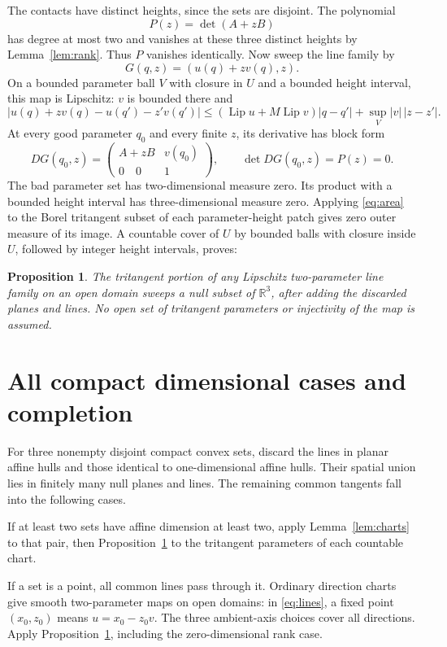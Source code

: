 \documentclass[11pt]{article}
\newcommand{\R}{\mathbb R}
\newtheorem{proposition}[theorem]{Proposition}
\theoremstyle{remark}
\begin{document}
The contacts have distinct heights, since the sets are disjoint. The polynomial
\[
P(z)=\det(A+zB)
\]
has degree at most two and vanishes at these three distinct heights by Lemma~\ref{lem:rank}. Thus $P$ vanishes identically. Now sweep the line family by
\[
G(q,z)=(u(q)+zv(q),z).
\]
On a bounded parameter ball $V$ with closure in $U$ and a bounded height interval, this map is Lipschitz: $v$ is bounded there and
\[
|u(q)+zv(q)-u(q')-z'v(q')|
\le (\operatorname{Lip}u+M\operatorname{Lip}v)|q-q'|+\sup_V|v|\,|z-z'|.
\]
At every good parameter $q_0$ and every finite $z$, its derivative has block form
\[
DG(q_0,z)=\begin{pmatrix}A+zB&v(q_0)\\0\quad0&1\end{pmatrix},
\qquad\det DG(q_0,z)=P(z)=0.
\]
The bad parameter set has two-dimensional measure zero. Its product with a bounded height interval has three-dimensional measure zero. Applying \eqref{eq:area} to the Borel tritangent subset of each parameter-height patch gives zero outer measure of its image. A countable cover of $U$ by bounded balls with closure inside $U$, followed by integer height intervals, proves:
\begin{proposition}\label{prop:sweep}
The tritangent portion of any Lipschitz two-parameter line family on an open domain sweeps a null subset of $\R^3$, after adding the discarded planes and lines. No open set of tritangent parameters or injectivity of the map is assumed.
\end{proposition}

\section{All compact dimensional cases and completion}
For three nonempty disjoint compact convex sets, discard the lines in planar affine hulls and those identical to one-dimensional affine hulls. Their spatial union lies in finitely many null planes and lines. The remaining common tangents fall into the following cases.

If at least two sets have affine dimension at least two, apply Lemma~\ref{lem:charts} to that pair, then Proposition~\ref{prop:sweep} to the tritangent parameters of each countable chart.

If a set is a point, all common lines pass through it. Ordinary direction charts give smooth two-parameter maps on open domains: in \eqref{eq:lines}, a fixed point $(x_0,z_0)$ means $u=x_0-z_0v$. The three ambient-axis choices cover all directions. Apply Proposition~\ref{prop:sweep}, including the zero-dimensional rank case.
\end{document}
